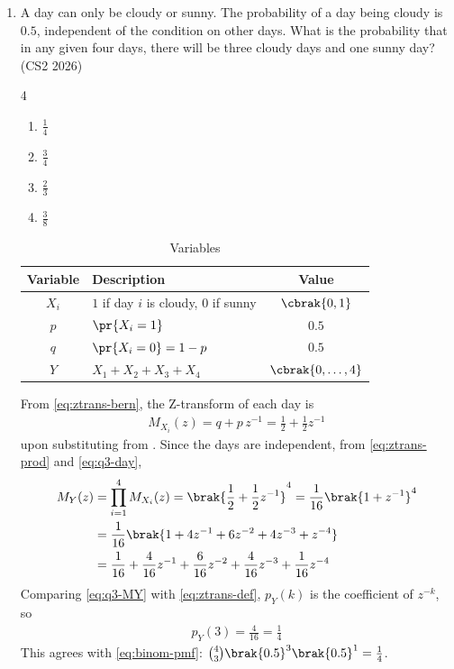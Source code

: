 \lstset{basicstyle=\ttfamily\small}

\begin{enumerate}[label=\thesubsection.\arabic*, ref=\thesubsection.\theenumi]

\item A day can only be cloudy or sunny. The probability of a day being
cloudy is $0.5$, independent of the condition on other days. What is the
probability that in any given four days, there will be three cloudy days
and one sunny day?
\hfill (CS2 2026)
\begin{multicols}{4}
\begin{enumerate}[label=\roman*)]
  \item $\frac{1}{4}$
  \item $\frac{3}{4}$
  \item $\frac{2}{3}$
  \item $\frac{3}{8}$
\end{enumerate}
\end{multicols}
\solution
\begin{table}[H]
\centering
\begin{tabular}{|c|l|c|}
\hline
\textbf{Variable} & \textbf{Description} & \textbf{Value} \\
\hline
$X_i$ & $1$ if day $i$ is cloudy, $0$ if sunny & $\cbrak{0,1}$ \\
$p$ & $\pr{X_i = 1}$ & $0.5$ \\
$q$ & $\pr{X_i = 0} = 1 - p$ & $0.5$ \\
$Y$ & $X_1 + X_2 + X_3 + X_4$ & $\cbrak{0,\dots,4}$ \\
\hline
\end{tabular}
\caption{Variables}
\label{tab:q3vars}
\end{table}
From \eqref{eq:ztrans-bern}, the Z-transform of each day is
\begin{align}
M_{X_i}(z) = q + p\, z^{-1} = \frac{1}{2} + \frac{1}{2} z^{-1}
\label{eq:q3-day}
\end{align}
upon substituting from . Since the days are
independent, from \eqref{eq:ztrans-prod} and \eqref{eq:q3-day},
\begin{align}
M_Y(z) &= \prod_{i=1}^{4} M_{X_i}(z) = \brak{\frac{1}{2} + \frac{1}{2} z^{-1}}^{4}
= \frac{1}{16}\brak{1 + z^{-1}}^{4} \\
&= \frac{1}{16}\brak{1 + 4z^{-1} + 6z^{-2} + 4z^{-3} + z^{-4}} \\
&= \frac{1}{16} + \frac{4}{16} z^{-1} + \frac{6}{16} z^{-2}
+ \frac{4}{16} z^{-3} + \frac{1}{16} z^{-4}
\label{eq:q3-MY}
\end{align}
Comparing \eqref{eq:q3-MY} with \eqref{eq:ztrans-def}, $p_Y(k)$ is the
coefficient of $z^{-k}$, so
\begin{align}
p_Y(3) = \frac{4}{16} = \frac{1}{4}
\end{align}
This agrees with \eqref{eq:binom-pmf}:
$\binom{4}{3}\brak{0.5}^{3}\brak{0.5}^{1} = \frac{1}{4}$.


\end{enumerate}
